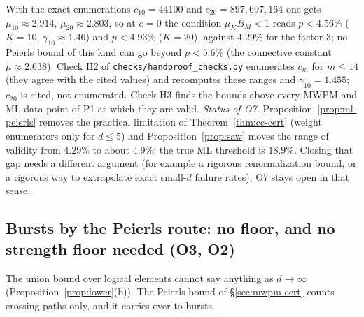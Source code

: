 \noindent With the exact enumerations $c_{10}=44100$ and $c_{20}=897{,}697{,}164$ \cite{MS} one gets $\mu_{10}\approx2.914$, $\mu_{20}\approx2.803$, so at $e=0$ the condition $\mu_KB_M<1$ reads $p<4.56\%$ ($K=10$, $\gamma_{10}\approx1.46$) and $p<4.93\%$ ($K=20$), against $4.29\%$ for the factor $3$; no Peierls bound of this kind can go beyond $p<5.6\%$ (the connective constant $\mu\approx2.638$). Check H2 of \texttt{checks/handproof\_checks.py} enumerates $c_m$ for $m\le14$ (they agree with the cited values) and recomputes these ranges and $\gamma_{10}=1.455$; $c_{20}$ is cited, not enumerated. Check H3 finds the bounds above every MWPM and ML data point of P1 at which they are valid.
\emph{Status of O7.} Proposition~\ref{prop:ml-peierls} removes the practical limitation of Theorem~\ref{thm:cc-cert} (weight enumerators only for $d\le5$) and Proposition~\ref{prop:saw} moves the range of validity from $4.29\%$ to about $4.9\%$; the true ML threshold is $18.9\%$. Closing that gap needs a different argument (for example a rigorous renormalization bound, or a rigorous way to extrapolate exact small-$d$ failure rates); O7 stays open in that sense.

\subsection{Bursts by the Peierls route: no floor, and no strength floor needed (O3, O2)}\label{sec:peierls-bursts}

The union bound over logical elements cannot say anything as $d\to\infty$ (Proposition~\ref{prop:lower}(b)). The Peierls bound of \S\ref{sec:mwpm-cert} counts crossing paths only, and it carries over to bursts.


